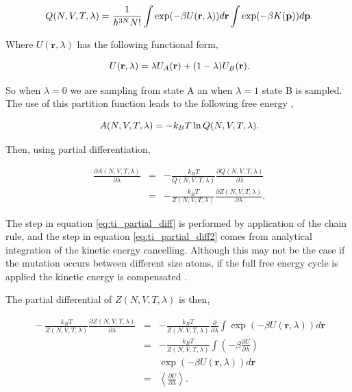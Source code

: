 \begin{equation}
\ Q(N,V,T,\lambda) = \frac{1}{h^{3N}N!}\int \exp(-\beta U(\mathbf{r}, \lambda))d \mathbf{r} \int \exp(-\beta K(\mathbf{p}))d \mathbf{p} \\.
\end{equation}

Where $U(\mathbf{r}, \lambda)$ has the following functional form,

\begin{equation}
\ U(\mathbf{r}, \lambda) = \lambda U_{A}(\mathbf{r})+ (1-\lambda) U_B (\mathbf{r}) \\.
\end{equation}

So when $\lambda=0$ we are sampling from state A an when $\lambda=1$ state B is sampled.  The use of this partition function leads to the following free energy \cite{Stat_mech},

\begin{equation}
\ A(N,V,T,\lambda)=-k_B T \ln Q(N,V,T,\lambda) \\.
\end{equation}

Then, using partial differentiation,

\begin{eqnarray} \label{eq:ti_partial_diff}
\ \frac{ \partial A(N,V,T,\lambda)}{\partial \lambda} &=& - \frac{k_BT}{Q(N,V,T, \lambda)} \frac{\partial Q(N,V,T, \lambda)}{\partial \lambda} \\ \label{eq:ti_partial_diff2}
\ &=& - \frac{k_BT}{Z(N,V,T, \lambda)} \frac{\partial Z(N,V,T, \lambda)}{\partial \lambda} .
\end{eqnarray}

The step in equation \ref{eq:ti_partial_diff} is performed by application of the chain rule, and the step in equation \ref{eq:ti_partial_diff2} comes from analytical integration of the kinetic energy cancelling.  Although this may not be the case if the mutation occurs between different size atoms, if the full free energy cycle is applied the kinetic energy is compensated \cite{Simulate_Phys_world}.

The partial differential of $Z(N,V,T, \lambda)$ is then,

\begin{eqnarray}
\ - \frac{k_BT}{Z(N,V,T, \lambda)} \frac{\partial Z(N,V,T, \lambda)}{\partial \lambda} &=& - \frac{k_BT}{Z(N,V,T, \lambda)} \frac{\partial}{\partial \lambda} \int  \exp(-\beta U(\mathbf{r}, \lambda))d \mathbf{r} \\
\ &=& - \frac{k_B T}{Z(N,V,T, \lambda)} \int \left( - \beta \frac{\partial U}{\partial \lambda} \right) \nonumber \\
& & \exp(-\beta U(\mathbf{r}, \lambda))d \mathbf{r} \\
\ &=& \left \langle \frac{\partial U}{\partial \lambda} \right\rangle .
\end{eqnarray}

